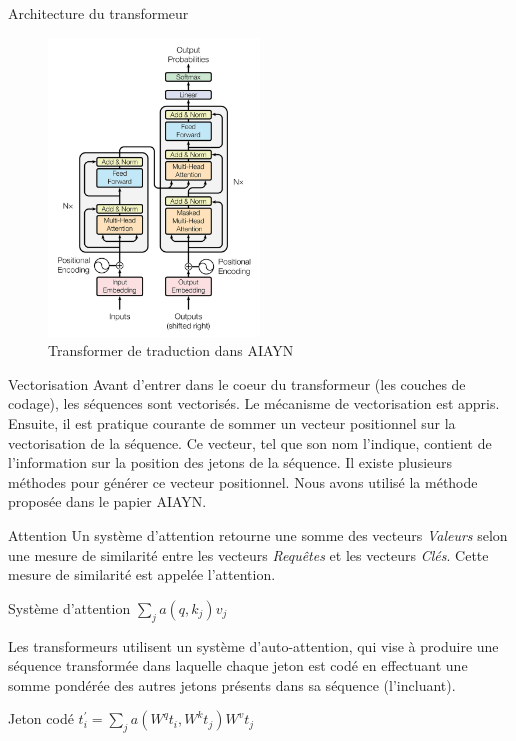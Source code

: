 \documentclass{beamer}
\begin{document}
\begin{frame}{Architecture du transformeur}
    \begin{figure} \label{fig:transformer}
        \caption{Transformer de traduction dans AIAYN} \center
        \includegraphics[width=0.5\textwidth]{images/2023-04-04-14-37-09.png}
    \end{figure}
    \end{frame}

\begin{frame}{Vectorisation}
    Avant d'entrer dans le coeur du transformeur (les couches de codage), les séquences sont 
    vectorisés. Le mécanisme de vectorisation est appris. Ensuite, il est
    pratique courante de sommer un vecteur positionnel sur 
    la vectorisation de la séquence. Ce vecteur, tel que son nom l'indique,
    contient de l'information sur la position des jetons de la séquence.
    Il existe plusieurs méthodes pour générer ce vecteur positionnel. Nous avons 
    utilisé la méthode proposée dans le papier AIAYN.
\end{frame}

\begin{frame}{Attention}
Un système d'attention retourne une somme des vecteurs \emph{Valeurs} selon 
une mesure de similarité entre les vecteurs \emph{Requêtes} et les vecteurs \emph{Clés}.
Cette mesure de similarité est appelée l'attention.
    \begin{block}{Système d'attention}
        $\sum_{j} a(q, k_j) v_j$
    \end{block}
Les transformeurs utilisent un système d'auto-attention, qui vise à produire
une séquence transformée dans laquelle chaque jeton est codé en effectuant une somme pondérée des
autres jetons présents dans sa séquence (l'incluant).
    \begin{block}{Jeton codé}
        $t_{i}^{'} = \sum_{j} a(W^{q}t_{i}, W^{k}t_j) W^{v}t_j$
    \end{block}
\end{frame}
\end{document}
